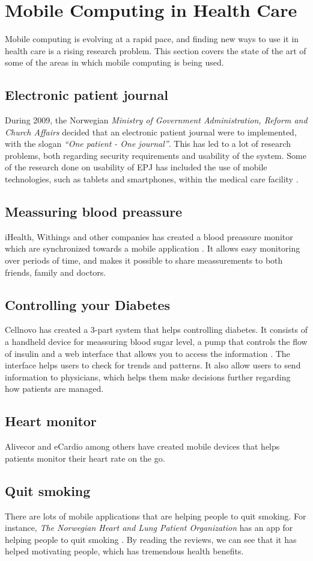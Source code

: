 \section{Mobile Computing in Health Care}
Mobile computing is evolving at a rapid pace, and finding new ways to use it in health care is a rising research problem. This section covers the state of the art of some of the areas in which mobile computing is being used.  

\subsection{Electronic patient journal}
During 2009, the Norwegian \emph{Ministry of Government Administration, Reform and Church Affairs} decided that an electronic patient journal were to implemented, with the slogan \emph{``One patient - One journal''}. This has led to a lot of research problems, both regarding security requirements and usability of the system. Some of the research done on usability of EPJ has included the use of mobile technologies, such as tablets and smartphones, within the medical care facility \cite{svanaes2010usability}.    

\subsection{Meassuring blood preassure}
iHealth, Withings and other companies has created a blood preassure monitor which are synchronized towards a mobile application \cite{ihealthlabs, withings}. It allows easy monitoring over periods of time, and makes it possible to share meassurements to both friends, family and doctors.


\subsection{Controlling your Diabetes}
Cellnovo has created a 3-part system that helps controlling diabetes. It consists of a handheld device for meassuring blood sugar level, a pump that controls the flow of insulin and a web interface that allows you to access the information \cite{cellnovo}. The interface helps users to check for trends and patterns. It also allow users to send information to physicians, which helps them make decisions further regarding how patients are managed.
   
\subsection{Heart monitor}
Alivecor and eCardio among others have created mobile devices that helps patients monitor their heart rate on the go\cite{eCardio, alivecor}. 

\subsection{Quit smoking}
There are lots of mobile applications that are helping people to quit smoking. For instance, \emph{The Norwegian Heart and Lung Patient Organization} has an app for helping people to quit smoking \cite{roykeslutt}. By reading the reviews, we can see that it has helped motivating people, which has tremendous health benefits. 

